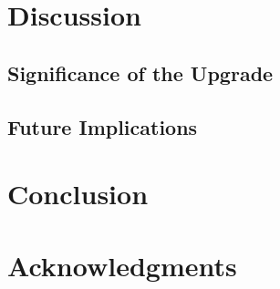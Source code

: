 \section{Discussion}
    \subsection{Significance of the Upgrade}
    \subsection{Future Implications}

\section{Conclusion}
\section{Acknowledgments}








